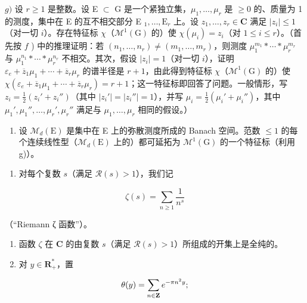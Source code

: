 \(g)\) 设 \(r \geqslant 1\) 是整数。设 E \(\subset\) G 是一个紧独立集，\(\mu_1, \ldots, \mu_r\) 是 \(\geqslant 0\) 的、质量为 1 的测度，集中在 E 的互不相交部分 E \(_1, \ldots, \text{E}_r\) 上。设 \(z_1, \ldots, z_r \in \mathbf{C}\) 满足 \(|z_i| \leqslant 1\)（对一切 \(i\)）。存在特征标 \(\chi\)（\(\mathcal{M}^1(\text{G})\) 的）使 \(\chi(\mu_i) = z_i\)（对 \(1 \leqslant i \leqslant r\)）。（首先按 \(f\) ) 中的推理证明：若 \((n_1, \ldots, n_r) \neq (m_1, \ldots, m_r)\)，则测度 \(\mu_1^{m_1} * \cdots * \mu_r^{m_r}\) 与 \(\mu_1^{n_1} * \cdots * \mu_r^{n_r}\) 不相交。其次，假设 \(|z_i| = 1\)（对一切 \(i\)），证明 \(\varepsilon_e + \overline{z}_1 \mu_1 + \cdots + \overline{z}_r \mu_r\) 的谱半径是 \(r+1\)，由此得到特征标 \(\chi\)（\(\mathcal{M}^1(\text{G})\) 的）使 \(\chi(\varepsilon_e + \overline{z}_1 \mu_1 + \cdots + \overline{z}_r \mu_r) = r+1\)；这一特征标即回答了问题。一般情形，写 \(z_i = \frac{1}{2}(z_i' + z_i'')\)（其中 \(|z_i'| = |z_i''| = 1\)），并写 \(\mu_i = \frac{1}{2}(\mu_i' + \mu_i'')\)，其中 \(\mu_1', \mu_1'', \ldots, \mu_r', \mu_r''\) 满足与 \(\mu_1, \ldots, \mu_r\) 相同的假设。）

\begin{enumerate}
\def\labelenumi{\alph{enumi})}
\setcounter{enumi}{7}
\tightlist
\item
  设 \(\mathcal{M}_{d}(\mathrm{E})\) 是集中在 E 上的弥散测度所成的 Banach 空间。范数 \(\leqslant 1\) 的每个连续线性型（\(\mathcal{M}_{d}(\mathrm{E})\) 上的）都可延拓为 \(\mathcal{M}^{1}(\mathrm{G})\) 的一个特征标（利用 g)）。
\end{enumerate}

\begin{enumerate}
\def\labelenumi{\arabic{enumi})}
\setcounter{enumi}{15}
\tightlist
\item
  对每个复数 \(s\)（满足 \(\mathcal{R}(s) > 1\)），我们记
\end{enumerate}

\[
\zeta (s) = \sum_ {n \geqslant 1} \frac {1}{n ^ {s}}
\]

（“Riemann ζ 函数”）。

\begin{enumerate}
\def\labelenumi{\alph{enumi})}
\item
  函数 \(\zeta\) 在 \(\mathbf{C}\) 的由复数 \(s\)（满足 \(\mathcal{R}(s) > 1\)）所组成的开集上是全纯的。
\item
  对 \(y\in \mathbf{R}_+^*\)，置
\end{enumerate}

\[
\theta (y) = \sum_ {n \in {\bf Z}} e ^ {- \pi n ^ {2} y};
\]

